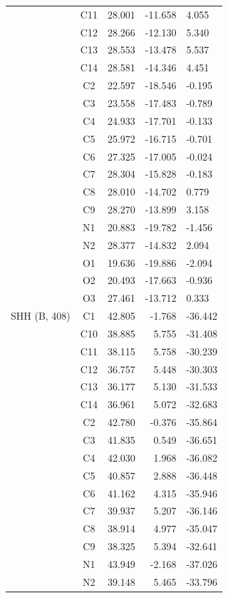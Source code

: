 \begin{longtable}{@{}lcrr@{}}
   & C11 & 28.001 & -11.658 & 4.055 \\
   & C12 & 28.266 & -12.130 & 5.340 \\
   & C13 & 28.553 & -13.478 & 5.537 \\
   & C14 & 28.581 & -14.346 & 4.451 \\
   & C2 & 22.597 & -18.546 & -0.195 \\
   & C3 & 23.558 & -17.483 & -0.789 \\
   & C4 & 24.933 & -17.701 & -0.133 \\
   & C5 & 25.972 & -16.715 & -0.701 \\
   & C6 & 27.325 & -17.005 & -0.024 \\
   & C7 & 28.304 & -15.828 & -0.183 \\
   & C8 & 28.010 & -14.702 & 0.779 \\
   & C9 & 28.270 & -13.899 & 3.158 \\
   & N1 & 20.883 & -19.782 & -1.456 \\
   & N2 & 28.377 & -14.832 & 2.094 \\
   & O1 & 19.636 & -19.886 & -2.094 \\
   & O2 & 20.493 & -17.663 & -0.936 \\
   & O3 & 27.461 & -13.712 & 0.333 \\
  \cmidrule(r){1-5}
  SHH (B, 408) & C1 & 42.805 & -1.768 & -36.442 \\
   & C10 & 38.885 & 5.755 & -31.408 \\
   & C11 & 38.115 & 5.758 & -30.239 \\
   & C12 & 36.757 & 5.448 & -30.303 \\
   & C13 & 36.177 & 5.130 & -31.533 \\
   & C14 & 36.961 & 5.072 & -32.683 \\
   & C2 & 42.780 & -0.376 & -35.864 \\
   & C3 & 41.835 & 0.549 & -36.651 \\
   & C4 & 42.030 & 1.968 & -36.082 \\
   & C5 & 40.857 & 2.888 & -36.448 \\
   & C6 & 41.162 & 4.315 & -35.946 \\
   & C7 & 39.937 & 5.207 & -36.146 \\
   & C8 & 38.914 & 4.977 & -35.047 \\
   & C9 & 38.325 & 5.394 & -32.641 \\
   & N1 & 43.949 & -2.168 & -37.026 \\
   & N2 & 39.148 & 5.465 & -33.796 \\

\end{longtable}
